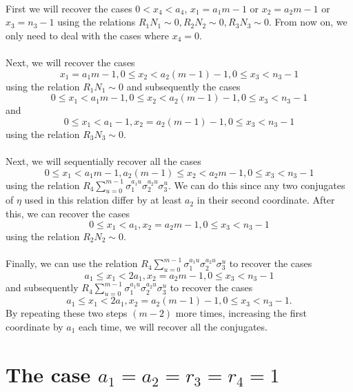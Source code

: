 \documentclass[12pt,a4paper]{article}
\theoremstyle{definition}
\begin{document}
\paragraph*{}
First we will recover the cases $0<x_4<a_4$, $x_1=a_1m-1$ or $x_2=a_2m-1$ or $x_3=n_3-1$ using the relations $R_1N_1\sim 0, R_2N_2\sim 0, R_3N_3\sim 0$. From now on, we only need to deal with the cases where $x_4=0$.
\paragraph*{}
Next, we will recover the cases $$x_1=a_1m-1, 0\leq x_2 < a_2(m-1)-1, 0\leq x_3 <n_3-1$$ using the relation $R_1N_1\sim 0$ and subsequently the cases $$0\leq x_1 < a_1m-1, 0\leq x_2 < a_2(m-1)-1, 0\leq x_3 <n_3-1$$ and $$0\leq x_1 < a_1-1, x_2 = a_2(m-1)-1, 0\leq x_3 <n_3-1$$ using the relation $R_3N_3\sim 0$.
\paragraph*{}
Next, we will sequentially recover all the cases $$0\leq x_1 < a_1m-1, a_2(m-1)\leq x_2 < a_2m-1, 0\leq x_3 <n_3-1$$
using the relation $R_4\sum_{u=0}^{m-1}\sigma_1^{a_1u}\sigma_2^{a_2u}\sigma_3^u$. We can do this since any two conjugates of $\eta$ used in this relation differ by at least $a_2$ in their second coordinate. After this, we can recover the cases $$0\leq x_1 < a_1, x_2 = a_2m-1, 0\leq x_3 <n_3-1$$ using the relation $R_2N_2\sim 0$.
\paragraph*{}
Finally, we can use the relation $R_4\sum_{u=0}^{m-1}\sigma_1^{a_1u}\sigma_2^{a_2u}\sigma_3^u$ to recover the cases $$a_1 \leq x_1 <2a_1, x_2 =a_2m-1, 0\leq x_3 <n_3-1$$ and subsequently $R_4\sum_{u=0}^{m-1}\sigma_1^{a_1u}\sigma_2^{a_2u}\sigma_3^u$ to recover the cases $$a_1 \leq x_1 <2a_1, x_2 =a_2(m-1)-1, 0\leq x_3 <n_3-1.$$ By repeating these two steps $(m-2)$ more times, increasing the first coordinate by $a_1$ each time, we will recover all the conjugates.

\section{The case $a_1=a_2=r_3=r_4=1$}
\end{document}
